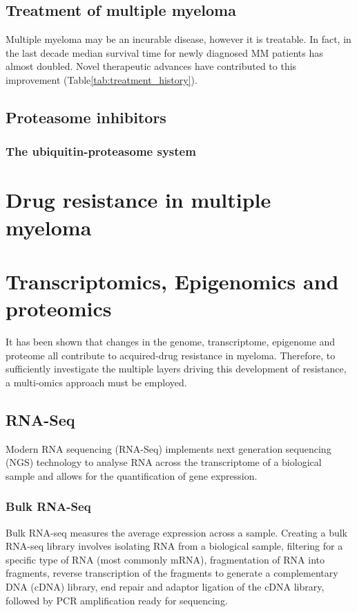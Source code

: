 \subsection{Treatment of multiple myeloma}
Multiple myeloma may be an incurable disease, however it is treatable.
In fact, in the last decade median survival time for newly diagnosed MM patients has almost doubled\cite{kazandjian2016look}.
Novel therapeutic advances have contributed to this improvement (Table\ref{tab:treatment_history}).



\subsection{Proteasome inhibitors}

\subsubsection{The ubiquitin-proteasome system}


\section{Drug resistance in multiple myeloma}


\section{Transcriptomics, Epigenomics and proteomics}
It has been shown that changes in the genome, transcriptome, epigenome and proteome all contribute to acquired-drug resistance in myeloma.
Therefore, to sufficiently investigate the multiple layers driving this development of resistance, a multi-omics approach must be employed.

\subsection{RNA-Seq}
Modern RNA sequencing (RNA-Seq) implements next generation sequencing (NGS) technology to analyse RNA across the transcriptome of a biological sample and allows for the quantification of gene expression.

\subsubsection{Bulk RNA-Seq}
Bulk RNA-seq measures the average expression across a sample.
Creating a bulk RNA-seq library involves isolating RNA from a biological sample, filtering for a specific type of RNA (most commonly mRNA), fragmentation of RNA into fragments, reverse transcription of the fragments to generate a complementary DNA (cDNA) library, end repair and adaptor ligation of the cDNA library, followed by PCR amplification ready for sequencing.

